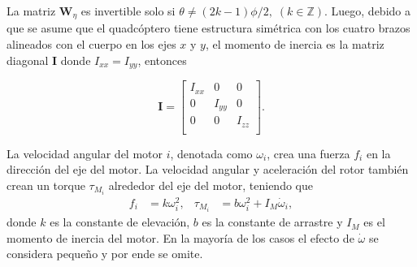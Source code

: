 \documentclass[11pt]{exam}
\begin{document}
        La matriz $\boldsymbol{W}_{\eta}$ es invertible solo si $\theta\neq(2k-1)\phi/2,\;(k\in\mathbb{Z})$. Luego, debido a que se asume que el quadc\'optero tiene estructura sim\'etrica con los cuatro brazos alineados con el cuerpo en los ejes $x$ y $y$, el momento de inercia es la matriz diagonal $\boldsymbol{I}$ donde $I_{xx} = I_{yy}$, entonces

        \begin{equation}
            \boldsymbol{I} = 
            \left[{
                \begin{array}{ccc}
                    I_{xx} & 0 & 0 \\
                    0 & I_{yy} & 0 \\
                    0 & 0 & I_{zz} \\
                \end{array} 
            }\right].
        \end{equation}

        La velocidad angular del motor $i$, denotada como $\omega_i$, crea una fuerza $f_i$ en la direcci\'on del eje del motor. La velocidad angular y aceleraci\'on del rotor tambi\'en crean un torque $\tau_{M_i}$ alrededor del eje del motor, teniendo que
        \begin{align}
            f_i &= k\omega_i^2, & \tau_{M_i} &= b\omega_i^2 + I_M\dot{\omega}_i,
        \end{align}
        donde $k$ es la constante de elevaci\'on, $b$ es la constante de arrastre y $I_M$ es el momento de inercia del motor. En la mayor\'ia de los casos el efecto de $\dot{\omega}$ se considera pequeño y por ende se omite.
\end{document}

